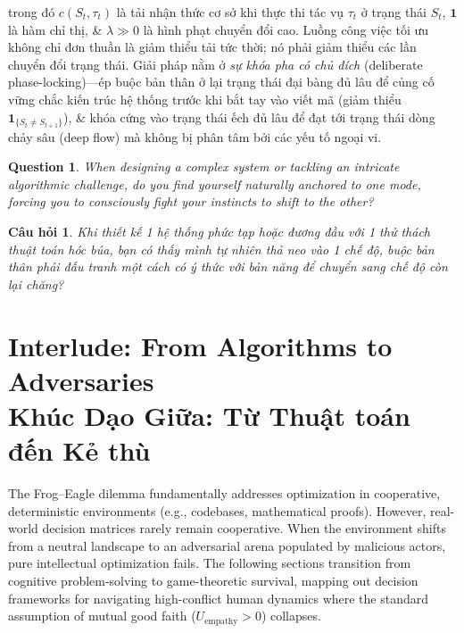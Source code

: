 \documentclass{article}
\newtheorem{question}{Question}
\newtheorem{cauhoi}{Câu hỏi}
\begin{document}
trong đó $c(S_t, \tau_t)$ là tải nhận thức cơ sở khi thực thi tác vụ $\tau_t$ ở trạng thái $S_t$, $\mathbf{1}$ là hàm chỉ thị, \& $\lambda \gg 0$ là hình phạt chuyển đổi cao. Luồng công việc tối ưu không chỉ đơn thuần là giảm thiểu tải tức thời; nó phải giảm thiểu các lần chuyển đổi trạng thái. Giải pháp nằm ở \textit{sự khóa pha có chủ đích} (deliberate phase-locking)---ép buộc bản thân ở lại trạng thái đại bàng đủ lâu để củng cố vững chắc kiến trúc hệ thống trước khi bắt tay vào viết mã (giảm thiểu $\mathbf{1}_{\{S_t \neq S_{t+1}\}}$), \& khóa cứng vào trạng thái ếch đủ lâu để đạt tới trạng thái dòng chảy sâu (deep flow) mà không bị phân tâm bởi các yếu tố ngoại vi.

\begin{question}
	When designing a complex system or tackling an intricate algorithmic challenge, do you find yourself naturally anchored to one mode, forcing you to consciously fight your instincts to shift to the other?
\end{question}
\begin{cauhoi}
	Khi thiết kế 1 hệ thống phức tạp hoặc đương đầu với 1 thử thách thuật toán hóc búa, bạn có thấy mình tự nhiên thả neo vào 1 chế độ, buộc bản thân phải đấu tranh một cách có ý thức với bản năng để chuyển sang chế độ còn lại chăng?
\end{cauhoi}

\section*{Interlude: From Algorithms to Adversaries\\ Khúc Dạo Giữa: Từ Thuật toán đến Kẻ thù}

The Frog--Eagle dilemma fundamentally addresses optimization in cooperative, deterministic environments (e.g., codebases, mathematical proofs). However, real-world decision matrices rarely remain cooperative. When the environment shifts from a neutral landscape to an adversarial arena populated by malicious actors, pure intellectual optimization fails. The following sections transition from cognitive problem-solving to game-theoretic survival, mapping out decision frameworks for navigating high-conflict human dynamics where the standard assumption of mutual good faith ($U_{\text{empathy}} > 0$) collapses.
\end{document}
